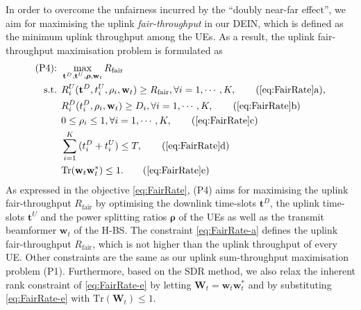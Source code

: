 \documentclass[12pt,draftcls,onecolumn,journal]{IEEEtran}
\begin{document}
In order to overcome the unfairness incurred by the ``doubly near-far effect'', we aim for maximising the uplink \textit{fair-throughput} in our DEIN, which is defined as the minimum uplink throughput among the UEs. As a result, the uplink fair-throughput maximisation problem is formulated as
\begin{align}
	\text{(P4): } & \max_{\mathbf{t}^D, \mathbf{t}^U, \boldsymbol{\rho}, \mathbf{w}_t} R_{\text{fair}} \label{eq:FairRate} \\
	\text{s.t. } & R_i^U(\mathbf{t}^D,t_i^U,\rho_i,\mathbf{w}_t) \geq R_{\text{fair}}, \forall i = 1,\cdots,K, \tag{\ref{eq:FairRate}a}, \label{eq:FairRate-a}\\
	& R_i^D(t_i^D,\rho_i, \mathbf{w}_t) \geq D_i, \forall i=1,\cdots,K, \tag{\ref{eq:FairRate}b} \label{eq:FairRate-b} \\
	&0 \leq \rho_i \leq 1, \forall i=1,\cdots,K,\tag{\ref{eq:FairRate}c} \label{eq:FairRate-c} \\
	&\sum_{i=1}^{K}{(t_i^D+t_i^U)}\leq T, \tag{\ref{eq:FairRate}d} \label{eq:FairRate-d}\\
	&\text{Tr}(\mathbf{w}_t\mathbf{w}_t^*) \leq 1. \tag{\ref{eq:FairRate}e} \label{eq:FairRate-e}
\end{align}
As expressed in the objective \eqref{eq:FairRate}, (P4) aims for maximising the uplink fair-throughput $R_{\text{fair}}$ by optimising the downlink time-slots $\mathbf{t}^D$, the uplink time-slots $\mathbf{t}^{U}$ and the power splitting ratios $\boldsymbol{\rho}$ of the UEs as well as the transmit beamformer $\mathbf{w}_t$ of the H-BS. The constraint \eqref{eq:FairRate-a} defines the uplink fair-throughput $R_{\text{fair}}$, which is not higher than the uplink throughput of every UE. Other constraints are the same as our uplink sum-throughput maximisation problem (P1). Furthermore, based on the SDR method, we also relax the inherent rank constraint of \eqref{eq:FairRate-e} by letting $\mathbf{W}_t = \mathbf{w}_t\mathbf{w}_t^*$ and by substituting \eqref{eq:FairRate-e} with $\text{Tr}(\mathbf{W}_t) \leq 1$.
\end{document}
